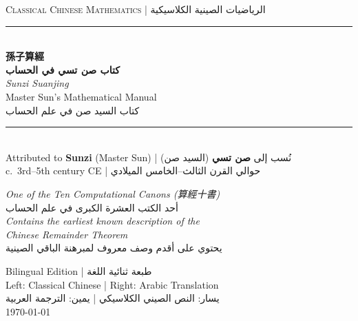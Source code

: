 \documentclass[11pt,a4paper]{article}
\newcommand{\ar}[1]{\arabicfont\beginR #1\endR}
\newcommand{\longline}{\noindent\rule{\textwidth}{0.4pt}}
\newcommand{\zh}[1]{{\CJKfamily{}#1}}
\begin{document}
\begin{titlepage}
\begin{center}
\vspace*{1.5cm}

{\fontsize{12}{14}\selectfont\textsc{Classical Chinese Mathematics | \ar{الرياضيات الصينية الكلاسيكية}}}\\[0.8cm]

\longline\\[1.2cm]

{\fontsize{32}{38}\selectfont\bfseries\color{titlecolor}
\zh{孫子算經}}\\[0.6cm]

{\fontsize{28}{34}\selectfont\bfseries\color{titlecolor}
\ar{كتاب صن تسي في الحساب}}\\[0.8cm]

{\fontsize{18}{22}\selectfont\itshape Sunzi Suanjing}\\[0.3cm]

{\fontsize{14}{18}\selectfont Master Sun's Mathematical Manual}\\[0.3cm]

{\fontsize{14}{18}\selectfont\ar{كتاب السيد صن في علم الحساب}}\\[1.2cm]

\longline\\[1.2cm]

{\large Attributed to \textbf{Sunzi} (Master Sun) | \ar{نُسب إلى \textbf{صن تسي} (السيد صن)}}\\[0.3cm]
{\normalsize c.\ 3rd--5th century CE | \ar{حوالي القرن الثالث–الخامس الميلادي}}\\[1.5cm]

\begin{tcolorbox}[colback=chinesebg,colframe=rulecolor,boxrule=1pt,
  width=0.85\textwidth,arc=3mm]
\centering
\small
\textit{One of the Ten Computational Canons (\zh{算經十書})}\\[3pt]
\ar{أحد الكتب العشرة الكبرى في علم الحساب}\\[5pt]
\textit{Contains the earliest known description of the\\Chinese Remainder Theorem}\\[3pt]
\ar{يحتوي على أقدم وصف معروف لمبرهنة الباقي الصينية}
\end{tcolorbox}

\vfill

{\small Bilingual Edition | \ar{طبعة ثنائية اللغة}}\\[0.3cm]
{\small Left: Classical Chinese | Right: Arabic Translation}\\[3pt]
{\small \ar{يسار: النص الصيني الكلاسيكي | يمين: الترجمة العربية}}\\[0.3cm]
{\small\today}

\end{center}
\end{titlepage}
\end{document}
